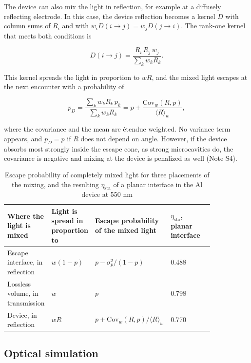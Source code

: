 \documentclass{optica-article}
\begin{document}
The device can also mix the light in reflection, for example at a diffusely reflecting electrode. In this case, the device reflection becomes a kernel $D$ with column sums of $R_i$ and with $w_i D(i\to j) = w_j D(j\to i)$. The rank-one kernel that meets both conditions is

\begin{equation}
\label{eq:8}
D(i\to j) = \frac{R_i\,R_j\,w_j}{\sum_k w_k R_k} .
\end{equation}

This kernel spreads the light in proportion to $wR$, and the mixed light escapes at the next encounter with a probability of

\begin{equation}
\label{eq:9}
p_D = \frac{\sum_k w_k R_k\,p_k}{\sum_k w_k R_k} = p + \frac{\mathrm{Cov}_w(R,p)}{\langle R\rangle_w},
\end{equation}

where the covariance and the mean are étendue weighted. No variance term appears, and $p_D = p$ if $R$ does not depend on angle. However, if the device absorbs most strongly inside the escape cone, as strong microcavities do, the covariance is negative and mixing at the device is penalized as well (Note S4).

\begin{table}[htbp]
\centering
\footnotesize
\caption{Escape probability of completely mixed light for three placements of the mixing, and the resulting $\eta_{\mathrm{sta}}$ of a planar interface in the Al device at 550 nm}
\label{tab:1}
\begin{tabular}{p{0.210\linewidth}p{0.210\linewidth}p{0.210\linewidth}p{0.210\linewidth}}
\hline
Where the light is mixed & Light is spread in proportion to & Escape probability of the mixed light & $\eta_{\mathrm{sta}}$, planar interface \\
\hline
Escape interface, in reflection & $w(1-p)$ & $p - \sigma_p^2/(1-p)$ & 0.488 \\
Lossless volume, in transmission & $w$ & $p$ & 0.798 \\
Device, in reflection & $wR$ & $p + \mathrm{Cov}_w(R,p)/\langle R\rangle_w$ & 0.770 \\
\hline
\end{tabular}
\end{table}

\subsection{Optical simulation}
\end{document}
